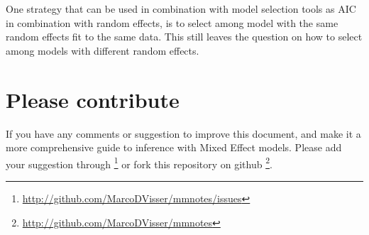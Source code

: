 \documentclass{article}\usepackage[]{graphicx}\usepackage[]{color}
\numberwithin{equation}{section} %
\numberwithin{figure}{section} %
\numberwithin{table}{section} %
\begin{document}
One strategy that can be used in combination with model selection tools as AIC in combination with random effects, is to select among model with the same random effects fit to the same data. This still leaves the question on how to select among models with different random effects.

\section{Please contribute}
If you have any comments or suggestion to improve this document, and make it a more comprehensive guide to inference with Mixed Effect models. Please add your suggestion through \footnote{\url{http://github.com/MarcoDVisser/mmnotes/issues}} or fork this repository on github \footnote{\url{http://github.com/MarcoDVisser/mmnotes}}.

    
    
\end{document}
